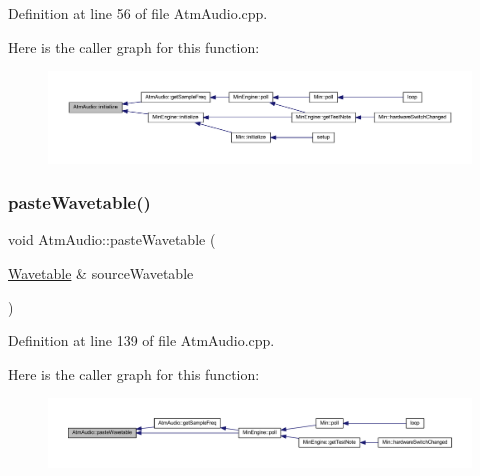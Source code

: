 Definition at line 56 of file Atm\+Audio.\+cpp.

Here is the caller graph for this function\+:
\nopagebreak
\begin{figure}[H]
\begin{center}
\leavevmode
\includegraphics[width=350pt]{d2/de6/class_atm_audio_ada27d4d2556b8b27f4c3c8b4da763176_icgraph}
\end{center}
\end{figure}
\mbox{\label{class_atm_audio_a3944db83a92a88144603c78b0260463a}} 
\subsubsection{\texorpdfstring{paste\+Wavetable()}{pasteWavetable()}}
{\footnotesize\ttfamily void Atm\+Audio\+::paste\+Wavetable (\begin{DoxyParamCaption}\item[{\hyperlink{class_wavetable}{Wavetable} \&}]{source\+Wavetable }\end{DoxyParamCaption})}



Definition at line 139 of file Atm\+Audio.\+cpp.

Here is the caller graph for this function\+:
\nopagebreak
\begin{figure}[H]
\begin{center}
\leavevmode
\includegraphics[width=350pt]{d2/de6/class_atm_audio_a3944db83a92a88144603c78b0260463a_icgraph}
\end{center}
\end{figure}
\mbox{\label{class_atm_audio_ab634d78d1e88550a4ed0ff1d93ed2d97}} 
